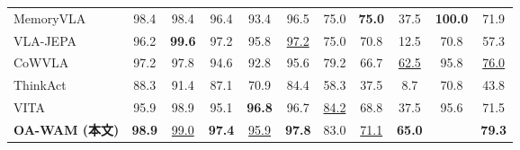 \documentclass{article}
\newcommand{\B}[1]{\textbf{#1}}                            %
\newcommand{\U}[1]{\underline{#1}}                         %
\newcommand{\hl}[1]{\cellcolor{ourshl}#1}                  %
\newcommand{\methodours}{\textbf{OA-WAM (本文)}}
\begin{document}
\begin{table}[!t]
{\begin{tabular}{l c c c c c c c c c c}
MemoryVLA~\citep{memoryvla}          & 98.4      & 98.4      & 96.4      & 93.4      & 96.5      & 75.0      & \B{75.0}  & 37.5      & \B{100.0} & 71.9 \\
VLA-JEPA~\citep{vlajepa}             & 96.2      & \B{99.6}  & 97.2      & 95.8      & \U{97.2}  & 75.0      & 70.8      & 12.5      & 70.8      & 57.3 \\
CoWVLA~\citep{cowvla}                & 97.2      & 97.8      & 94.6      & 92.8      & 95.6      & 79.2      & 66.7      & \U{62.5}  & 95.8      & \U{76.0} \\
ThinkAct~\citep{thinkact}            & 88.3      & 91.4      & 87.1      & 70.9      & 84.4      & 58.3      & 37.5      & 8.7       & 70.8      & 43.8 \\
VITA~\citep{vita}                    & 95.9      & 98.9      & 95.1      & \B{96.8}  & 96.7      & \U{84.2}  & 68.8      & 37.5      & 95.6      & 71.5 \\
\hl{\methodours{}} & \hl{\B{98.9}} & \hl{\U{99.0}} & \hl{\B{97.4}} & \hl{\U{95.9}} & \hl{\B{97.8}} & \hl{83.0} & \hl{\U{71.1}} & \hl{\B{65.0}} & \hl{{98.2}} & \hl{\B{79.3}} \\
\bottomrule

\end{tabular}}
\end{table}
\end{document}
